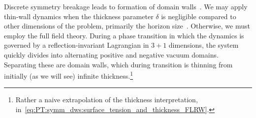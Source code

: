 



\newcommand{\lcoord}{\ALIASlcoord} %
\newcommand{\lcoordx}{\ALIASlcoordx} %
\newcommand{\lcoordk}{\ALIASlcoordk} %
\newcommand*\Ft{\ALIASFt}
\newcommand\dummy{\ALIASdummy}
\newcommand*\Tw{\ALIASTw}
\newcommand*\Twf{\ALIASTwf}
\newcommand*\wallsep{\ALIASwallsep}












Discrete symmetry breakage leads to formation of domain walls~\citep{vilenkinCosmicStringsOther1994}. %
We may apply thin-wall dynamics when the thickness parameter $\delta$ is negligible compared to other dimensions of the problem, primarily the horizon size~\citep{vilenkinCosmicStringsOther1994}. Otherwise, we must employ the full field theory. %
During a phase transition in which the dynamics is governed by a reflection-invariant Lagrangian in $3+1$ dimensions, the system quickly divides into alternating positive and negative vacuum domains. %
Separating these are domain walls, which during transition is thinning from initially (as we will see) infinite thickness.\footnote{Rather a naive extrapolation of the thickness interpretation, in~\cref{eq:PT:symm_dws:surface_tension_and_thickness_FLRW}.}  


